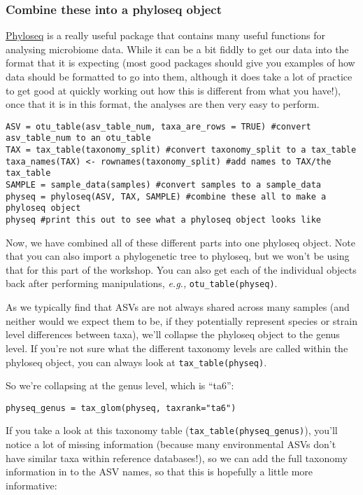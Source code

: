 \documentclass[
]{book}
\begin{document}
\subsubsection{Combine these into a phyloseq object}\label{combine-these-into-a-phyloseq-object}

\href{https://joey711.github.io/phyloseq/}{Phyloseq} is a really useful package that contains many useful functions for analysing microbiome data. While it can be a bit fiddly to get our data into the format that it is expecting (most good packages should give you examples of how data should be formatted to go into them, although it does take a lot of practice to get good at quickly working out how this is different from what you have!), once that it is in this format, the analyses are then very easy to perform.

\begin{verbatim}
ASV = otu_table(asv_table_num, taxa_are_rows = TRUE) #convert asv_table_num to an otu_table
TAX = tax_table(taxonomy_split) #convert taxonomy_split to a tax_table
taxa_names(TAX) <- rownames(taxonomy_split) #add names to TAX/the tax_table
SAMPLE = sample_data(samples) #convert samples to a sample_data
physeq = phyloseq(ASV, TAX, SAMPLE) #combine these all to make a phyloseq object
physeq #print this out to see what a phyloseq object looks like
\end{verbatim}

Now, we have combined all of these different parts into one phyloseq object. Note that you can also import a phylogenetic tree to phyloseq, but we won't be using that for this part of the workshop. You can also get each of the individual objects back after performing manipulations, \emph{e.g.,} \texttt{otu\_table(physeq)}.

As we typically find that ASVs are not always shared across many samples (and neither would we expect them to be, if they potentially represent species or strain level differences between taxa), we'll collapse the phyloseq object to the genus level. If you're not sure what the different taxonomy levels are called within the phyloseq object, you can always look at \texttt{tax\_table(physeq)}.

So we're collapsing at the genus level, which is ``ta6'':

\begin{verbatim}
physeq_genus = tax_glom(physeq, taxrank="ta6")
\end{verbatim}

If you take a look at this taxonomy table (\texttt{tax\_table(physeq\_genus)}), you'll notice a lot of missing information (because many environmental ASVs don't have similar taxa within reference databases!), so we can add the full taxonomy information in to the ASV names, so that this is hopefully a little more informative:
\end{document}
